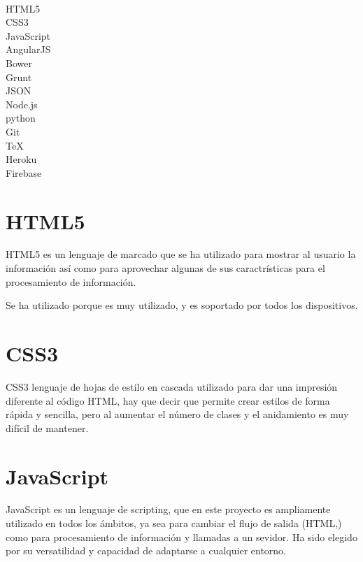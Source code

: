 
{   \\}{ 
HTML5 \\
CSS3  \\
JavaScript \\
AngularJS \\
Bower \\
Grunt \\
JSON \\
Node.js \\
python \\
Git \\
\TeX{}\\
Heroku\\
Firebase\\
} 

\section{HTML5}\label{HTML5}

HTML5 es un lenguaje de marcado que se ha utilizado para mostrar al usuario la información así como para aprovechar algunas de sus caractrísticas para el procesamiento de información.

Se ha utilizado porque es muy utilizado, y es soportado por todos los dispositivos.

\section{CSS3}\label{CSS3}

CSS3 lenguaje de hojas de estilo en cascada utilizado para dar una impresión diferente al código HTML, hay que decir que permite crear estilos de forma rápida y sencilla, pero al aumentar el número de clases y el anidamiento es muy difícil de mantener. 

\section{JavaScript}\label{JavaScript}

JavaScript es un lenguaje de scripting, que en este proyecto es ampliamente utilizado en todos los ámbitos, ya sea para cambiar el flujo de salida (HTML,) como para procesamiento de información y llamadas a un sevidor. Ha sido elegido por su versatilidad y capacidad de adaptarse a cualquier entorno.

